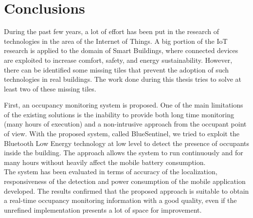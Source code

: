 %
%
\cleardoublepage
%
%
%
\chapter*{Conclusions}
%
%
\label{cap:conclusions}
%
%
During the past few years, a lot of effort has been put in the research of technologies in the area of the Internet of Things. A big portion of the IoT research is applied to the domain of Smart Buildings, where connected devices are exploited to increase comfort, safety, and energy sustainability.
However, there can be identified some missing tiles that prevent the adoption of such technologies in real buildings.
The work done during this thesis tries to solve at least two of these missing tiles.

First, an occupancy monitoring system is proposed. One of the main limitations of the existing solutions is the inability to provide both long time monitoring (many hours of execution) and a non-intrusive approach from the occupant point of view.
With the proposed system, called BlueSentinel, we tried to exploit the Bluetooth Low Energy technology at low level to detect the presence of occupants inside the building. The approach allows the system to run continuously and for many hours without heavily affect the mobile battery consumption.\\
The system has been evaluated in terms of accuracy of the localization, responsiveness of the detection and power consumption of the mobile application developed. The results confirmed that the proposed approach is suitable to obtain a real-time occupancy monitoring information with a good quality, even if the unrefined implementation presents a lot of space for improvement.

